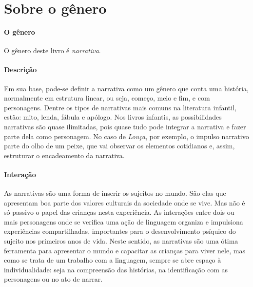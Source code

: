 \documentclass[11pt]{extarticle}
\begin{document}
\section{Sobre o gênero}

\paragraph{O gênero} O gênero deste livro é \textit{narrativa}. 


\paragraph{Descrição} Em sua base, pode-se definir a narrativa como um gênero que conta uma história, normalmente em estrutura linear, ou seja, começo, meio e fim, e com personagens. 
Dentre os tipos de narrativas mais comuns na literatura infantil, estão: mito, lenda, 
fábula e apólogo. Nos livros infantis, as possibilidades narrativas são quase ilimitadas, pois quase tudo pode integrar a narrativa e fazer parte dela como personagem. No caso de \textit{Louça}, por exemplo, o impulso narrativo parte do olho de um peixe, que vai observar os elementos cotidianos e, assim, estruturar o encadeamento da narrativa.


\paragraph{Interação} As narrativas são uma forma de inserir os sujeitos no mundo. 
São elas que apresentam boa parte dos valores culturais da sociedade 
onde se vive. Mas não é só passivo o papel das crianças nesta experiência. 
As interações entre dois ou mais personagens onde se verifica
uma ação de linguagem organiza e impulsiona experiências compartilhadas,
importantes para o desenvolvimento psíquico do sujeito nos primeiros anos de vida.
Neste sentido, as narrativas são uma ótima ferramenta para
apresentar o mundo e capacitar as crianças para viver nele, mas como se
trata de um trabalho com a linguagem, sempre se abre espaço à individualidade: 
seja na compreensão das histórias, na identificação com as personagens ou 
no ato de narrar.

\end{document}
